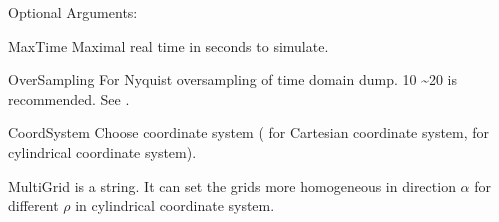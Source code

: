 \begin{FontDescr}{Optional Arguments:}
    \begin{FontPara}{MaxTime}  \label{para:MaxTime}
    Maximal real time in seconds to simulate.
    \end{FontPara}
    \begin{FontPara}{OverSampling}  \label{para:OverSampling}
    For Nyquist oversampling of time domain dump. 10 \textasciitilde 20 is recommended. See \cite{Nyquist-Shannon_sampling}.
    \end{FontPara}
    \begin{FontPara}{CoordSystem}  \label{para:CoordSystem}
    Choose coordinate system ( for Cartesian coordinate system,  for cylindrical coordinate system).
    \end{FontPara}
    \begin{FontPara}{MultiGrid}  \label{para:MultiGrid}
     is a string. It can set the grids more homogeneous in direction $\alpha$ for different $\rho$ in cylindrical coordinate system.
    \end{FontPara}
\end{FontDescr}

